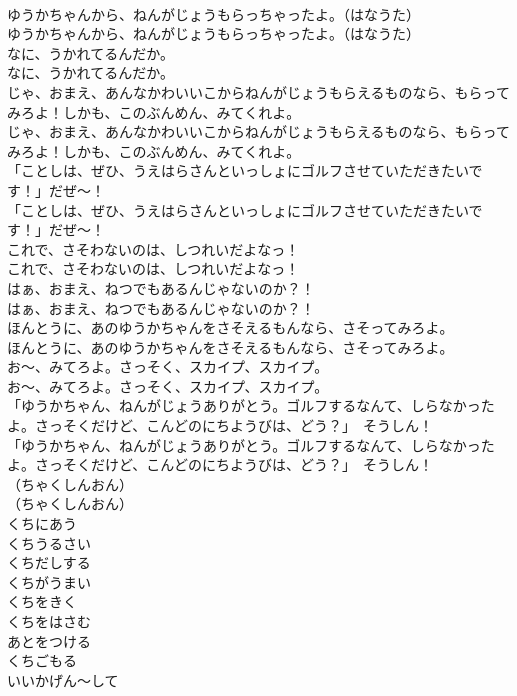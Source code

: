 \documentclass[8pt]{extreport}
\begin{document}
\begin{CJK}{UTF8}{min}
\\	ゆうかちゃんから、ねんがじょうもらっちゃったよ。（はなうた）
\\	ゆうかちゃんから、ねんがじょうもらっちゃったよ。（はなうた）
\\	なに、うかれてるんだか。
\\	なに、うかれてるんだか。
\\	じゃ、おまえ、あんなかわいいこからねんがじょうもらえるものなら、もらってみろよ！しかも、このぶんめん、みてくれよ。
\\	じゃ、おまえ、あんなかわいいこからねんがじょうもらえるものなら、もらってみろよ！しかも、このぶんめん、みてくれよ。
\\	「ことしは、ぜひ、うえはらさんといっしょにゴルフさせていただきたいです！」だぜ～！
\\	「ことしは、ぜひ、うえはらさんといっしょにゴルフさせていただきたいです！」だぜ～！
\\	これで、さそわないのは、しつれいだよなっ！
\\	これで、さそわないのは、しつれいだよなっ！
\\	はぁ、おまえ、ねつでもあるんじゃないのか？！
\\	はぁ、おまえ、ねつでもあるんじゃないのか？！
\\	ほんとうに、あのゆうかちゃんをさそえるもんなら、さそってみろよ。
\\	ほんとうに、あのゆうかちゃんをさそえるもんなら、さそってみろよ。
\\	お～、みてろよ。さっそく、スカイプ、スカイプ。
\\	お～、みてろよ。さっそく、スカイプ、スカイプ。
\\	「ゆうかちゃん、ねんがじょうありがとう。ゴルフするなんて、しらなかったよ。さっそくだけど、こんどのにちようびは、どう？」　そうしん！
\\	「ゆうかちゃん、ねんがじょうありがとう。ゴルフするなんて、しらなかったよ。さっそくだけど、こんどのにちようびは、どう？」　そうしん！
\\	（ちゃくしんおん）
\\	（ちゃくしんおん）
\\	くちにあう
\\	くちうるさい
\\	くちだしする
\\	くちがうまい
\\	くちをきく
\\	くちをはさむ
\\	あとをつける
\\	くちごもる
\\	いいかげん〜して

\end{CJK}
\end{document}
